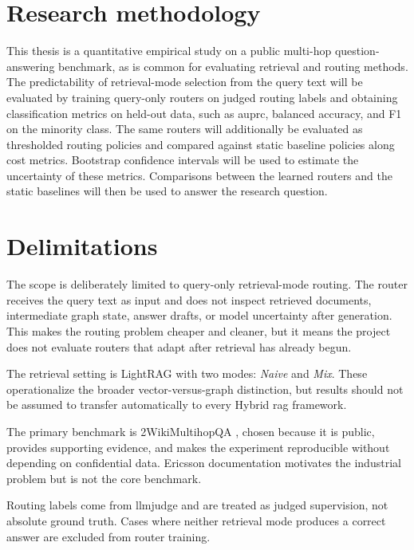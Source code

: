 \documentclass[english, bibtex]{kththesis}               %
\numberwithin{listing}{chapter}
\begin{document}
\section{Research methodology}
\label{sec:researchMethodology}

This thesis is a quantitative empirical study on a public multi-hop question-answering benchmark, as is common for evaluating retrieval and routing methods. The predictability of retrieval-mode selection from the query text will be evaluated by training query-only routers on judged routing labels and obtaining classification metrics on held-out data, such as \gls{auprc}, balanced accuracy, and F1 on the minority class. The same routers will additionally be evaluated as thresholded routing policies and compared against static baseline policies along cost metrics. Bootstrap confidence intervals will be used to estimate the uncertainty of these metrics. Comparisons between the learned routers and the static baselines will then be used to answer the research question.

\section{Delimitations}
\label{sec:delimitations}

The scope is deliberately limited to query-only retrieval-mode routing. The router receives the query text as input and does not inspect retrieved documents, intermediate graph state, answer drafts, or model uncertainty after generation. This makes the routing problem cheaper and cleaner, but it means the project does not evaluate routers that adapt after retrieval has already begun.

The retrieval setting is LightRAG with two modes: \emph{Naive} and \emph{Mix}. These operationalize the broader vector-versus-graph distinction, but results should not be assumed to transfer automatically to every Hybrid \gls{rag} framework.

The primary benchmark is 2WikiMultihopQA \cite{ho2020twowiki}, chosen because it is public, provides supporting evidence, and makes the experiment reproducible without depending on confidential data. Ericsson documentation motivates the industrial problem but is not the core benchmark.

Routing labels come from \gls{llmjudge} and are treated as judged supervision, not absolute ground truth. Cases where neither retrieval mode produces a correct answer are excluded from router training.
\end{document}
